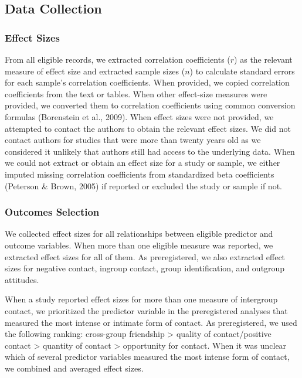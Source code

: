 \documentclass[twocolumn, 11pt, letterpaper]{article}
\begin{document}
\hypertarget{data-collection}{%
\subsection{Data Collection}\label{data-collection}}

\hypertarget{effect-sizes}{%
\subsubsection{Effect Sizes}\label{effect-sizes}}

From all eligible records, we extracted correlation coefficients (\(r\))
as the relevant measure of effect size and extracted sample sizes
(\(n\)) to calculate standard errors for each sample's correlation
coefficients. When provided, we copied correlation coefficients from the
text or tables. When other effect-size measures were provided, we
converted them to correlation coefficients using common conversion
formulas (Borenstein et al., 2009). When effect sizes were not provided,
we attempted to contact the authors to obtain the relevant effect sizes.
We did not contact authors for studies that were more than twenty years
old as we considered it unlikely that authors still had access to the
underlying data. When we could not extract or obtain an effect size for
a study or sample, we either imputed missing correlation coefficients
from standardized beta coefficients (Peterson \& Brown, 2005) if
reported or excluded the study or sample if not.

\hypertarget{outcomes-selection}{%
\subsubsection{Outcomes Selection}\label{outcomes-selection}}

We collected effect sizes for all relationships between eligible
predictor and outcome variables. When more than one eligible measure was
reported, we extracted effect sizes for all of them. As preregistered,
we also extracted effect sizes for negative contact, ingroup contact,
group identification, and outgroup attitudes.

When a study reported effect sizes for more than one measure of
intergroup contact, we prioritized the predictor variable in the
preregistered analyses that measured the most intense or intimate form
of contact. As preregistered, we used the following ranking: cross-group
friendship \textgreater{} quality of contact/positive contact
\textgreater{} quantity of contact \textgreater{} opportunity for
contact. When it was unclear which of several predictor variables
measured the most intense form of contact, we combined and averaged
effect sizes.
\end{document}
